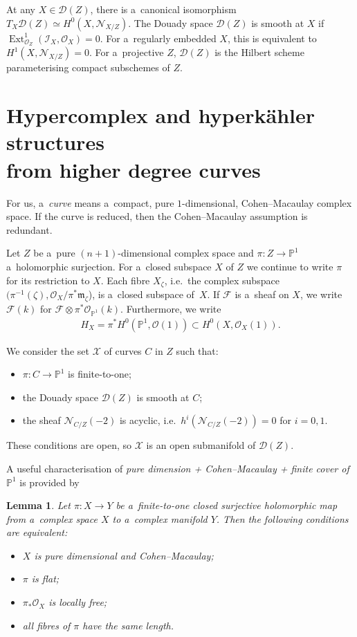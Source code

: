 \documentclass[pdftex]{sigma}
\numberwithin{equation}{section}
\newtheorem{Lemma}[Theorem]{Lemma}
\begin{document}
At any $X\in {\mathcal{D}}(Z)$, there is a~canonical isomorphism $T_X{\mathcal{D}}(Z)\simeq H^0(X,{\mathcal{N}}_{X/Z})$.
The Douady space ${\mathcal{D}}(Z)$ is smooth at $X$ if $\operatorname{Ext}^1_{{\mathcal{O}}_Z}(
{\mathcal{I}}_X,{\mathcal{O}}_X)=0$.
For a~regularly embedded $X$, this is equivalent to $H^1(X,{\mathcal{N}}_{X/Z})=0$.
For a~projective $Z$, ${\mathcal{D}}(Z)$ is the Hilbert scheme parameterising compact subschemes of $Z$.

\section{Hypercomplex and hyperk\"ahler structures\\ from higher degree curves}\label{hgc}

For us, a~{\em curve} means a~compact, pure $1$-dimensional, Cohen--Macaulay complex space.
If the curve is reduced, then the Cohen--Macaulay assumption is redundant.

Let $Z$ be a~pure $(n+1)$-dimensional complex space and $\pi:Z\to {\mathbb{P}}^1$ a~holomorphic surjection.
For a~closed subspace $X$ of $Z$ we continue to write $\pi$ for its restriction to $X$.
Each f\/ibre $X_\zeta$, i.e.\
the complex subspace $(\pi^{-1}(\zeta), {\mathcal{O}}_X/\pi^\ast\mathfrak{m}_\zeta$), is a~closed subspace of~$X$.
If ${\mathcal{F}}$ is a~sheaf on $X$, we write ${\mathcal{F}}(k)$ for ${\mathcal{F}}\otimes \pi^\ast
{\mathcal{O}}_{{\mathbb{P}}^1}(k)$.
Furthermore, we write
\begin{gather*}
H_X=\pi^\ast H^0({\mathbb{P}}^1,{\mathcal{O}}(1)) \subset H^0(X,{\mathcal{O}}_X(1)).
\end{gather*}

We consider the set ${\mathcal{X}}$ of curves $C$ in $Z$ such that:
\begin{itemize}\itemsep=0pt
\item
$\pi:C\to {\mathbb{P}}^1$ is f\/inite-to-one;
\item
the Douady space ${\mathcal{D}}(Z)$ is smooth at $C$;
\item
the sheaf ${\mathcal{N}}_{C/Z}(-2)$ is acyclic, i.e.\
$h^i({\mathcal{N}}_{C/Z}(-2))=0$ for $i=0,1$.
\end{itemize}
These conditions are open, so ${\mathcal{X}}$ is an open submanifold of ${\mathcal{D}}(Z)$.

A useful characterisation of {\em pure dimension + Cohen--Macaulay + finite cover of ${\mathbb{P}}^1$} is provided by

\begin{Lemma}\label{CM}
Let $\pi:X\to Y$ be a~finite-to-one closed surjective holomorphic map from a~complex space $X$ to a~complex manifold
$Y$.
Then the following conditions are equivalent:
\begin{itemize}\itemsep=0pt
\item[$(i)$] $X$ is pure dimensional and Cohen--Macaulay;
\item[$(ii)$] $\pi$ is flat;
\item[$(iii)$] $\pi_\ast{\mathcal{O}}_X$ is locally free;
\item[$(iv)$] all fibres of $\pi$ have the same length.
\end{itemize}
\end{Lemma}
\end{document}
